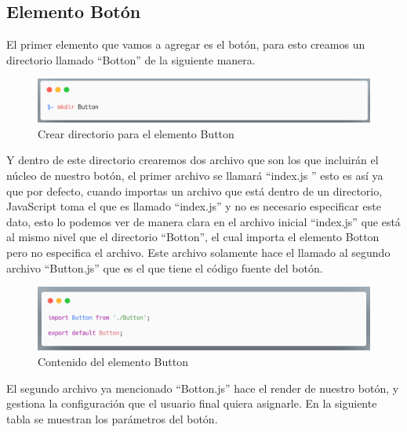 \subsection{Elemento Botón}
El primer elemento que vamos a agregar es el botón, para esto creamos un directorio llamado “Botton” de la siguiente manera.
\newline
\newline
\begin{figure}[H]
    \includegraphics[width=1\textwidth]{./Imagenes/carbon-3.png}
    \caption[Crear directorio para el elemento Button]{Crear directorio para el elemento Button}
    \end{figure}
\newline
\newline
Y dentro de este directorio crearemos dos archivo que son los que incluirán el núcleo de nuestro botón, el primer archivo se llamará “index.js ” esto es así ya que por defecto, cuando importas un archivo que está dentro de un directorio, JavaScript toma el que es llamado “index.js” y no es necesario especificar este dato, esto lo podemos ver de manera clara en el archivo inicial “index.js” que está al mismo nivel que el directorio “Botton”, el cual importa el elemento Botton pero no especifica el archivo. Este archivo solamente hace el llamado al segundo archivo “Button.js” que es el que tiene el código fuente del botón. 
\newline
\newline
\begin{figure}[H]
    \includegraphics[width=1\textwidth]{./Imagenes/carbon-5.png}
    \caption[Contenido del elemento Button]{Contenido del elemento Button}
    \end{figure}
\newline
\newline
El segundo archivo ya mencionado “Botton.js”  hace el render de nuestro botón, y gestiona la configuración que el usuario final quiera asignarle.
En la siguiente tabla se muestran los parámetros del botón.

